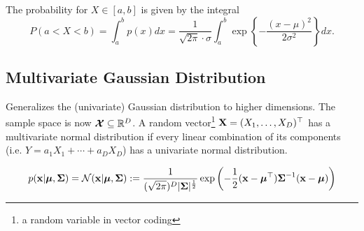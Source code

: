 \begin{definition}
The probability for \(X \in [a, b]\) is given by the integral \[
P(a < X < b) = \int_a^b p(x) dx = \frac{1}{\sqrt{2 \pi} \cdot \sigma} \int_a^b \exp \left\lbrace -\frac{(x - \mu)^2}{2\sigma^2} \right\rbrace dx.
\]
\end{definition}

\subsection{Multivariate Gaussian Distribution}
Generalizes the (univariate) Gaussian distribution to higher dimensions. The sample space is now \(\boldsymbol{\mathrm{\mathcal{X}}} \subseteq \mathbb{R}^D\). A random vector\footnote{a random variable in vector coding} \(\boldsymbol{\mathrm{X}} = (X_1, \ldots, X_D)^\top\) has a multivariate normal distribution if every linear combination of its components (i.e. \(Y = a_1 X_1 + \cdots + a_D X_D\)) has a univariate normal distribution.

\begin{definition}
\[
p(\boldsymbol{\mathrm{x}}|\boldsymbol{\mathrm{\mu}}, \boldsymbol{\mathrm{\Sigma}}) = \mathcal{N}(\boldsymbol{\mathrm{x}}|\boldsymbol{\mathrm{\mu}}, \boldsymbol{\mathrm{\Sigma}}) :=
\frac{1}{(\sqrt{2\pi})^D |\boldsymbol{\mathrm{\Sigma}}|^\frac{1}{2}} \exp \left( -\frac{1}{2}(\boldsymbol{\mathrm{x}} - \boldsymbol{\mathrm{\mu}}^\top) \boldsymbol{\mathrm{\Sigma}}^{-1} (\boldsymbol{\mathrm{x}} - \boldsymbol{\mathrm{\mu}}) \right)
\]
\end{definition}

